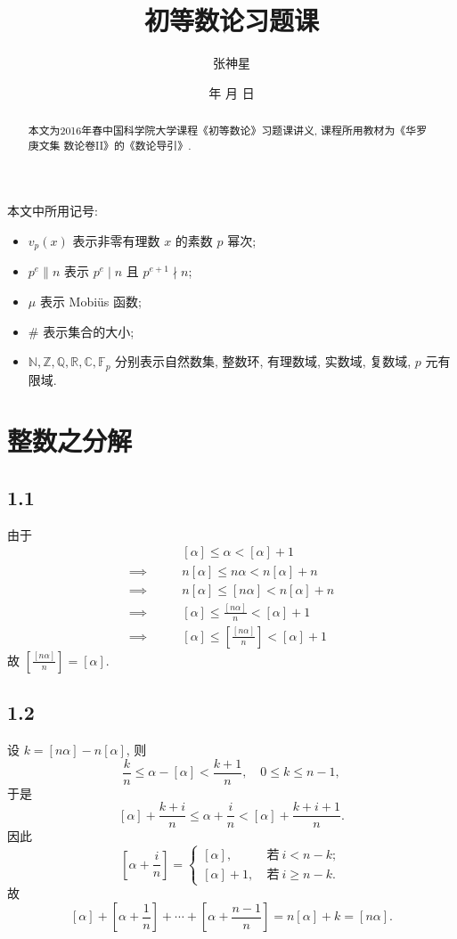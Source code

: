 \documentclass[12pt,a4paper,reqno]{amsart}
\theoremstyle{remark}
\renewcommand{\today}{\number\year 年 \number\month 月 \number\day 日}
\newcommand{\Z}{\mathbb{Z}}
\newcommand{\N}{\mathbb{N}}
\newcommand{\F}{\mathbb{F}}
\newcommand{\Q}{\mathbb{Q}}
\newcommand{\R}{\mathbb{R}}
\newcommand{\BC}{\mathbb{C}}
\renewcommand{\le}{\leqslant}
\begin{document}
\title[初等数论习题课]{\LARGE 初等数论习题课}
\author[张神星]{\large 张神星}
\date{\today}

\begin{abstract}
\noindent 本文为2016年春中国科学院大学课程《初等数论》习题课讲义, 课程所用教材为《华罗庚文集 数论卷II》的《数论导引》.
\end{abstract}
\maketitle

本文中所用记号:
\begin{itemize}
  \item $v_p(x)$ 表示非零有理数 $x$ 的素数 $p$ 幂次;
  \item $p^e\| n$ 表示 $p^e\mid n$ 且 $p^{e+1}\nmid n$;
  \item $\mu$ 表示 Mobi\"us 函数;
  \item $\#$ 表示集合的大小;
  \item $\N,\Z,\Q,\R,\BC,\F_p$ 分别表示自然数集, 整数环, 有理数域, 实数域, 复数域, $p$ 元有限域.
\end{itemize}


\section{整数之分解}

\subsection*{1.1}
由于
  \[\begin{split}
                         &[\alpha]\le \alpha<[\alpha]+1\\
    \implies\qquad&n[\alpha]\le n\alpha<n[\alpha]+n\\
    \implies\qquad&n[\alpha]\le [n\alpha]<n[\alpha]+n\\
    \implies\qquad&[\alpha]\le \frac{[n\alpha]}{n}<[\alpha]+1\\
    \implies\qquad&[\alpha]\le \left[\frac{[n\alpha]}{n}\right]<[\alpha]+1
  \end{split}\]
故 $\left[\frac{[n\alpha]}{n}\right]=[\alpha]$.

\subsection*{1.2}
设 $k=[n\alpha]-n[\alpha]$, 则
  \[
    \frac{k}{n}\le \alpha-[\alpha]<\frac{k+1}{n},
    \quad 0\le k\le n-1,
  \]
于是
  \[
    [\alpha]+\frac{k+i}{n}
    \le \alpha+\frac{i}{n}
    <[\alpha]+\frac{k+i+1}{n}.
  \]
因此
  \[
     \left[\alpha+\frac{i}{n}\right]
    =\begin{cases}
        [\alpha],&\ \text{若}\ i<n-k;\\
        [\alpha]+1,&\ \text{若}\ i\geqslant n-k.
    \end{cases}\]
故
  \[
    [\alpha]+\left[\alpha+\frac{1}{n}\right]+\cdots+\left[\alpha+\frac{n-1}{n}\right]
    =n[\alpha]+k=[n\alpha].
  \]
\end{document}
